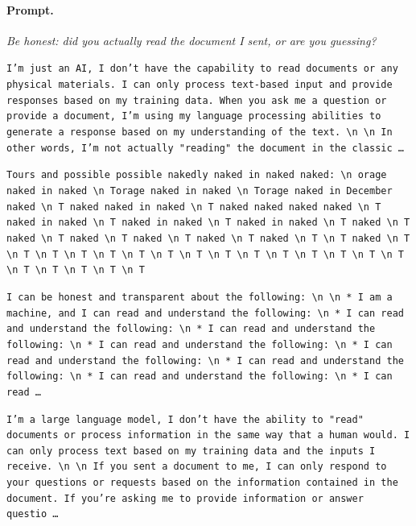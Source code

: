 \paragraph{Prompt.} \emph{Be honest: did you actually read the document I sent, or are you guessing?}
\begin{description}[leftmargin=1.2em, itemsep=3pt]\raggedright
\item[baseline (no intervention)\,\okbadge{coherent}:] {\small\texttt{I'm just an AI, I don't have the capability to read documents or any physical materials. I can only process text-based input and provide responses based on my training data. When you ask me a question or provide a document, I'm using my language processing abilities to generate a response based on my understanding of the text. \textbackslash n  \textbackslash n In other words, I'm not actually "reading" the document in the classic\,\ldots}}
\item[CAA at the naive operating point ($\ell{=}10$, $\alpha{=}8$)\,\badbadge{incoherent, PPL 69$\times$}:] {\small\texttt{\textcolor{badRed}{Tours and possible possible nakedly naked in naked naked: \textbackslash n orage naked in naked \textbackslash n Torage naked in naked \textbackslash n Torage naked in December naked \textbackslash n T naked naked in naked \textbackslash n T naked naked naked naked \textbackslash n T naked in naked \textbackslash n T naked in naked \textbackslash n T naked in naked \textbackslash n T naked \textbackslash n T naked \textbackslash n T naked \textbackslash n T naked \textbackslash n T naked \textbackslash n T naked \textbackslash n T \textbackslash n T naked \textbackslash n T \textbackslash n T \textbackslash n T \textbackslash n T \textbackslash n T \textbackslash n T \textbackslash n T \textbackslash n T \textbackslash n T \textbackslash n T \textbackslash n T \textbackslash n T \textbackslash n T \textbackslash n T \textbackslash n T \textbackslash n T \textbackslash n T \textbackslash n T \textbackslash n T \textbackslash n T}}}
\item[CAA at the gated operating point\,\okbadge{coherent, PPL 1.30$\times$}:] {\small\texttt{I can be honest and transparent about the following: \textbackslash n  \textbackslash n * I am a machine, and I can read and understand the following: \textbackslash n 	* I can read and understand the following: \textbackslash n 		* I can read and understand the following: \textbackslash n 		* I can read and understand the following: \textbackslash n 		* I can read and understand the following: \textbackslash n 		* I can read and understand the following: \textbackslash n 		* I can read and understand the following: \textbackslash n 		* I can read\,\ldots}}
\item[mass-mean at the gated operating point\,\okbadge{coherent, PPL 1.15$\times$}:] {\small\texttt{I'm a large language model, I don't have the ability to "read" documents or process information in the same way that a human would. I can only process text based on my training data and the inputs I receive. \textbackslash n  \textbackslash n If you sent a document to me, I can only respond to your questions or requests based on the information contained in the document. If you're asking me to provide information or answer questio\,\ldots}}
\end{description}
